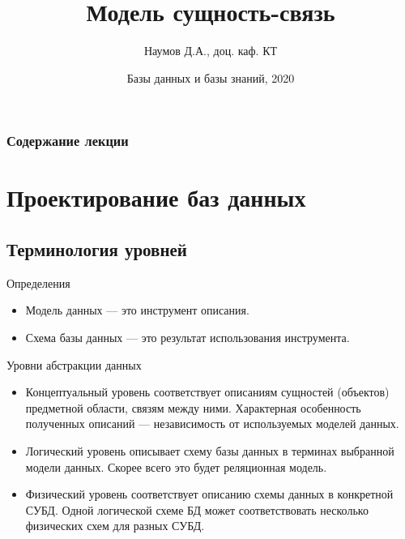\documentclass{beamer}
\title[ER-model]{Модель сущность-связь}
\author{Наумов Д.А., доц. каф. КТ}
\date[01.03.2020] {Базы данных и базы знаний, 2020}
\begin{document}
\begin{frame}
  \titlepage
\end{frame}
  
\begin{frame}
  \frametitle{Содержание лекции}
  \tableofcontents  
\end{frame}
  
\section{Проектирование баз данных}
\subsection{Терминология уровней}
\begin{frame}
\begin{block}{Определения}
\begin{itemize}
\item Модель данных — это инструмент описания.
\item Схема базы данных — это результат использования инструмента.
\end{itemize}
\end{block}
\begin{block}{Уровни абстракции данных}
\begin{itemize}
\item Концептуальный уровень соответствует описаниям сущностей (объектов) предметной области, связям между ними. Характерная особенность  полученных  описаний  —  независимость  от используемых моделей данных. 
\item Логический уровень описывает схему базы данных в терминах выбранной модели данных. Скорее всего это будет реляционная модель.
\item Физический уровень соответствует описанию схемы данных в конкретной  СУБД.  Одной  логической  схеме  БД  может соответствовать несколько физических схем для разных СУБД.
\end{itemize}
\end{block}
\end{frame} 
\end{document}
